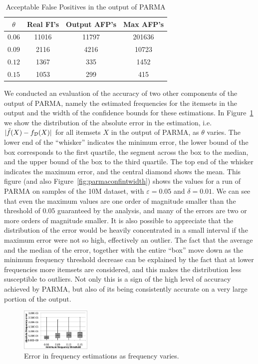 \begin{table}
  \centering
  \begin{tabular}{cccc}
    \hline
    $\theta$ & Real FI's & Output AFP's & Max AFP's \\
    \hline
    $0.06$ & 11016 & 11797 & 201636 \\
    $0.09$ & 2116& 4216& 10723 \\
    $0.12$ & 1367& 335& 1452\\
    $0.15$ & 1053& 299& 415\\
    \hline
  \end{tabular}
  \caption{Acceptable False Positives in the output of PARMA}
  \label{tab:falsepositives}
\end{table}

We conducted an evaluation of the accuracy of two other components of the
output of PARMA, namely the estimated frequencies for the itemsets in the output
and the width of the confidence bounds for these estimations. In
Figure~\ref{fig:parmaabsfreqerr} we show the distribution of the absolute error in
the estimation, i.e. $|\tilde{f}(X)-f_{\cal D}(X)|$ for all itemsets $X$ in the
output of PARMA, as $\theta$ varies. The lower end of the ``whisker'' indicates the minimum error,
the lower bound of the box corresponds to the first quartile, the segment across
the box to the median, and the upper bound of the box to the third quartile. The
top end of the whisker indicates the maximum error, and the central diamond
shows the mean. This figure (and also Figure~\ref{fig:parmaconfintwidth}) shows the values
for a run of PARMA on samples of the 10M dataset, with $\varepsilon=0.05$ and
$\delta=0.01$. We can see that even the maximum values are one order of
magnitude smaller than the threshold of $0.05$ guaranteed by the analysis, and
many of the errors are two or more orders of magnitude smaller. It is also
possible to appreciate that the distribution of the error would be heavily concentrated in a
small interval if the maximum error were not so high, effectively an outlier.
The fact that the average and the median of the error, together with the entire ``box'' move down as the
minimum frequency threshold decrease can be explained by the fact that at lower
frequencies more itemsets are considered, and this makes the distribution less
susceptible to outliers. Not only this is a sign of the high level of accuracy
achieved by PARMA, but also of its being consistently accurate on
a very large portion of the output.

\begin{figure}[htb]
 \centering
    \includegraphics[width=0.3\textwidth]{parma/absfreqerr}
  \caption{Error in frequency estimations as frequency varies.}
  \label{fig:parmaabsfreqerr}
\end{figure}

